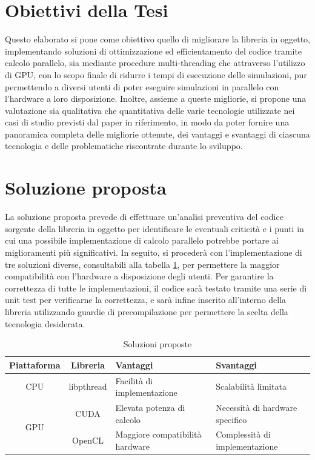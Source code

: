 \section{Obiettivi della Tesi}
\label{sec:obiettivi}

Questo elaborato si pone come obiettivo quello di migliorare la libreria in oggetto,
implementando soluzioni di ottimizzazione ed efficientamento del codice tramite
calcolo parallelo, sia mediante procedure multi-threading che attraverso l'utilizzo
di GPU, con lo scopo finale di ridurre i tempi di esecuzione delle simulazioni, pur
permettendo a diversi utenti di poter eseguire simulazioni in parallelo con l'hardware
a loro disposizione. Inoltre, assieme a queste migliorie, si propone una
valutazione sia qualitativa che quantitativa delle varie tecnologie utilizzate
nei casi di studio previsti dal paper in riferimento\cite{cooperis}, in modo da
poter fornire una panoramica completa delle migliorie ottenute, dei vantaggi e svantaggi
di ciascuna tecnologia e delle problematiche riscontrate durante lo sviluppo.

\section{Soluzione proposta}
\label{sec:soluzione}

La soluzione proposta prevede di effettuare un'analisi preventiva del codice
sorgente della libreria in oggetto per identificare le eventuali criticità e i
punti in cui una possibile implementazione di calcolo parallelo potrebbe portare
ai miglioramenti più significativi. In seguito, si procederà con l'implementazione
di tre soluzioni diverse, consultabili alla tabella \ref{tab:soluzioni}, per
permettere la maggior compatibilità con l'hardware a disposizione degli utenti. Per
garantire la correttezza di tutte le implementazioni, il codice sarà testato
tramite una serie di unit test per verificarne la correttezza, e sarà infine inserito
all'interno della libreria utilizzando guardie di precompilazione per permettere
la scelta della tecnologia desiderata.

\begin{table}[ht]
  \begin{center}
    \begin{tabular}{ |c|c|l|l| }
      \hline
      \textbf{Piattaforma} & \textbf{Libreria} & \textbf{Vantaggi}               & \textbf{Svantaggi}              \\
      \hline
      CPU                  & libpthread        & Facilità di implementazione     & Scalabilità limitata            \\
      \hline
      \multirow{2}{*}{GPU} & CUDA              & Elevata potenza di calcolo      & Necessità di hardware specifico \\
      \cline{2-4}          & OpenCL            & Maggiore compatibilità hardware & Complessità di implementazione  \\
      \hline
    \end{tabular}
    \caption{Soluzioni proposte}
    \label{tab:soluzioni}
  \end{center}
\end{table}